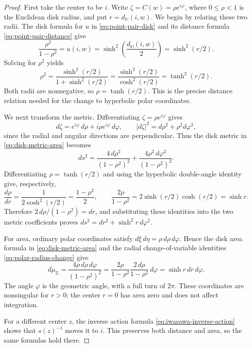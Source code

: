 \begin{proof}
First take the center to be $i$. Write $\zeta=C(w)=\rho e^{i\varphi}$, where $0\leq\rho<1$ is the Euclidean disk radius, and put $r=d_{\mathbb H}(i,w)$. We begin by relating these two radii. The disk formula for $u$ in \eqref{eq:point-pair-disk} and its distance formula \eqref{eq:point-pair-distance} give
\[
 \frac{\rho^2}{1-\rho^2}
 =u(i,w)
 =\sinh^2\!\left(\frac{d_{\mathbb H}(i,w)}2\right)
 =\sinh^2(r/2).
\]
Solving for $\rho^2$ yields
\[
 \rho^2=\frac{\sinh^2(r/2)}{1+\sinh^2(r/2)}
       =\frac{\sinh^2(r/2)}{\cosh^2(r/2)}
       =\tanh^2(r/2).
\]
Both radii are nonnegative, so $\rho=\tanh(r/2)$. This is the precise distance relation needed for the change to hyperbolic polar coordinates.

We next transform the metric. Differentiating $\zeta=\rho e^{i\varphi}$ gives
\[
 d\zeta=e^{i\varphi}\,d\rho+i\rho e^{i\varphi}\,d\varphi,
 \qquad |d\zeta|^2=d\rho^2+\rho^2d\varphi^2,
\]
since the radial and angular directions are perpendicular. Thus the disk metric in \eqref{eq:disk-metric-area} becomes
\[
 ds^2=\frac{4\,d\rho^2}{(1-\rho^2)^2}
      +\frac{4\rho^2\,d\varphi^2}{(1-\rho^2)^2}.
\]
Differentiating $\rho=\tanh(r/2)$ and using the hyperbolic double-angle identity give, respectively,
\begin{equation}\label{eq:polar-radius-change}
 \frac{d\rho}{dr}=\frac{1}{2\cosh^2(r/2)}
                 =\frac{1-\rho^2}{2},\qquad
 \frac{2\rho}{1-\rho^2}
 =2\sinh(r/2)\cosh(r/2)=\sinh r.
\end{equation}
Therefore $2\,d\rho/(1-\rho^2)=dr$, and substituting these identities into the two metric coefficients proves $ds^2=dr^2+\sinh^2r\,d\varphi^2$.

For area, ordinary polar coordinates satisfy $d\xi\,d\eta=\rho\,d\rho\,d\varphi$. Hence the disk area formula in \eqref{eq:disk-metric-area} and the radial change-of-variable identities \eqref{eq:polar-radius-change} give
\[
 d\mu_{\mathbb D}
 =\frac{4\rho\,d\rho\,d\varphi}{(1-\rho^2)^2}
 =\frac{2\rho}{1-\rho^2}\frac{2\,d\rho}{1-\rho^2}\,d\varphi
 =\sinh r\,dr\,d\varphi.
\]
The angle $\varphi$ is the geometric angle, with a full turn of $2\pi$. These coordinates are nonsingular for $r>0$; the center $r=0$ has area zero and does not affect integration.

For a different center $z$, the inverse action formula \eqref{eq:iwasawa-inverse-action} shows that $s(z)^{-1}$ moves it to $i$. This preserves both distance and area, so the same formulas hold there.
\end{proof}

